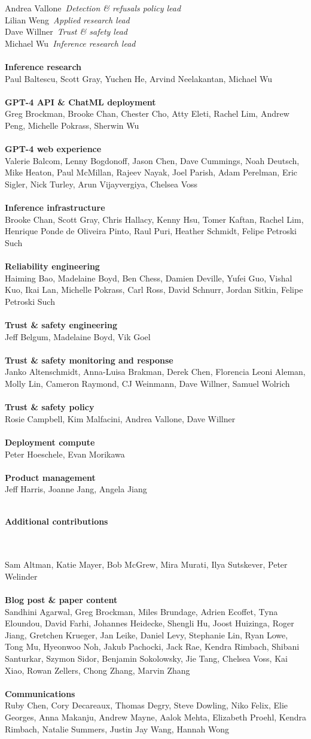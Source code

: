 \documentclass{article}
\newcommand{\creditsectionheader}[1]{\parbox{\columnwidth}{\centering \textbf{\small #1}}\\}
\newcommand{\creditlistheader}[1]{\textbf{#1}\footnotemark[\thefootnote]\\}
\newcommand{\creditlist}[2]{\creditlistheader{#1}#2\\
\\}
\newcommand{\corecontributor}[2]{#1\ \textit{#2}\\}
\begin{document}
\begin{multicols}{2}
\corecontributor{Andrea Vallone}{Detection \& refusals policy lead}
\corecontributor{Lilian Weng}{Applied research lead}
\corecontributor{Dave Willner}{Trust \& safety lead}
\corecontributor{Michael Wu}{Inference research lead}
\\
\creditlist{Inference research}{Paul Baltescu, Scott Gray, Yuchen He, Arvind Neelakantan, Michael Wu}
\creditlist{GPT-4 API \& ChatML deployment}{Greg Brockman, Brooke Chan, Chester Cho, Atty Eleti, Rachel Lim, Andrew Peng, Michelle Pokrass, Sherwin Wu}
\creditlist{GPT-4 web experience}{Valerie Balcom, Lenny Bogdonoff, Jason Chen, Dave Cummings, Noah Deutsch, Mike Heaton, Paul McMillan, Rajeev Nayak, Joel Parish, Adam Perelman, Eric Sigler, Nick Turley, Arun Vijayvergiya, Chelsea Voss}
\creditlist{Inference infrastructure}{Brooke Chan, Scott Gray, Chris Hallacy, Kenny Hsu, Tomer Kaftan, Rachel Lim, Henrique Ponde de Oliveira Pinto, Raul Puri, Heather Schmidt, Felipe Petroski Such}
\creditlist{Reliability engineering}{Haiming Bao, Madelaine Boyd, Ben Chess, Damien Deville, Yufei Guo, Vishal Kuo, Ikai Lan, Michelle Pokrass, Carl Ross, David Schnurr, Jordan Sitkin, Felipe Petroski Such}
\creditlist{Trust \& safety engineering}{Jeff Belgum, Madelaine Boyd, Vik Goel}
\creditlist{Trust \& safety monitoring and response}{Janko Altenschmidt, Anna-Luisa Brakman, Derek Chen, Florencia Leoni Aleman, Molly Lin, Cameron Raymond, CJ Weinmann, Dave Willner, Samuel Wolrich}
\creditlist{Trust \& safety policy}{Rosie Campbell, Kim Malfacini, Andrea Vallone, Dave Willner}
\creditlist{Deployment compute}{Peter Hoeschele, Evan Morikawa}
\creditlist{Product management}{Jeff Harris, Joanne Jang, Angela Jiang}
\creditsectionheader{Additional contributions}
\\
Sam Altman, Katie Mayer, Bob McGrew, Mira Murati, Ilya Sutskever, Peter Welinder\footnotemark[\thefootnote]\\
\\
\creditlist{Blog post \& paper content}{Sandhini Agarwal, Greg Brockman, Miles Brundage, Adrien Ecoffet, Tyna Eloundou, David Farhi, Johannes Heidecke, Shengli Hu, Joost Huizinga, Roger Jiang, Gretchen Krueger, Jan Leike, Daniel Levy, Stephanie Lin, Ryan Lowe, Tong Mu, Hyeonwoo Noh, Jakub Pachocki, Jack Rae, Kendra Rimbach, Shibani Santurkar, Szymon Sidor, Benjamin Sokolowsky, Jie Tang, Chelsea Voss, Kai Xiao, Rowan Zellers, Chong Zhang, Marvin Zhang}
\creditlist{Communications}{Ruby Chen, Cory Decareaux, Thomas Degry, Steve Dowling, Niko Felix, Elie Georges, Anna Makanju, Andrew Mayne, Aalok Mehta, Elizabeth Proehl, Kendra Rimbach, Natalie Summers, Justin Jay Wang, Hannah Wong}

\end{multicols}
\end{document}

